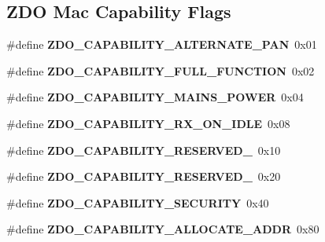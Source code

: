 \subsection*{Z\-D\-O Mac Capability Flags}
\begin{DoxyCompactItemize}
\item 
\hypertarget{group__zdo_ga37c6821b48ca70aef7c64b1f3763571d}{\#define {\bfseries Z\-D\-O\-\_\-\-C\-A\-P\-A\-B\-I\-L\-I\-T\-Y\-\_\-\-A\-L\-T\-E\-R\-N\-A\-T\-E\-\_\-\-P\-A\-N}~0x01}\label{group__zdo_ga37c6821b48ca70aef7c64b1f3763571d}

\item 
\hypertarget{group__zdo_gaf94e4d8a7b20ab1cbb3fba7bc0dd1c41}{\#define {\bfseries Z\-D\-O\-\_\-\-C\-A\-P\-A\-B\-I\-L\-I\-T\-Y\-\_\-\-F\-U\-L\-L\-\_\-\-F\-U\-N\-C\-T\-I\-O\-N}~0x02}\label{group__zdo_gaf94e4d8a7b20ab1cbb3fba7bc0dd1c41}

\item 
\hypertarget{group__zdo_gab04c9345bdf68648eec414b84e1f87c6}{\#define {\bfseries Z\-D\-O\-\_\-\-C\-A\-P\-A\-B\-I\-L\-I\-T\-Y\-\_\-\-M\-A\-I\-N\-S\-\_\-\-P\-O\-W\-E\-R}~0x04}\label{group__zdo_gab04c9345bdf68648eec414b84e1f87c6}

\item 
\hypertarget{group__zdo_ga88e90d61371411240533e1a939c79671}{\#define {\bfseries Z\-D\-O\-\_\-\-C\-A\-P\-A\-B\-I\-L\-I\-T\-Y\-\_\-\-R\-X\-\_\-\-O\-N\-\_\-\-I\-D\-L\-E}~0x08}\label{group__zdo_ga88e90d61371411240533e1a939c79671}

\item 
\hypertarget{group__zdo_gacd166110237f016d80559f0a001f8d28}{\#define {\bfseries Z\-D\-O\-\_\-\-C\-A\-P\-A\-B\-I\-L\-I\-T\-Y\-\_\-\-R\-E\-S\-E\-R\-V\-E\-D\-\_}~0x10}\label{group__zdo_gacd166110237f016d80559f0a001f8d28}

\item 
\hypertarget{group__zdo_ga149bb219f6e1e84e51d60650124e46cc}{\#define {\bfseries Z\-D\-O\-\_\-\-C\-A\-P\-A\-B\-I\-L\-I\-T\-Y\-\_\-\-R\-E\-S\-E\-R\-V\-E\-D\-\_}~0x20}\label{group__zdo_ga149bb219f6e1e84e51d60650124e46cc}

\item 
\hypertarget{group__zdo_gafccc4c34b99048dd420457b867c4d158}{\#define {\bfseries Z\-D\-O\-\_\-\-C\-A\-P\-A\-B\-I\-L\-I\-T\-Y\-\_\-\-S\-E\-C\-U\-R\-I\-T\-Y}~0x40}\label{group__zdo_gafccc4c34b99048dd420457b867c4d158}

\item 
\hypertarget{group__zdo_gaf97614279526a70a93516e8ac3be9024}{\#define {\bfseries Z\-D\-O\-\_\-\-C\-A\-P\-A\-B\-I\-L\-I\-T\-Y\-\_\-\-A\-L\-L\-O\-C\-A\-T\-E\-\_\-\-A\-D\-D\-R}~0x80}\label{group__zdo_gaf97614279526a70a93516e8ac3be9024}

\end{DoxyCompactItemize}
